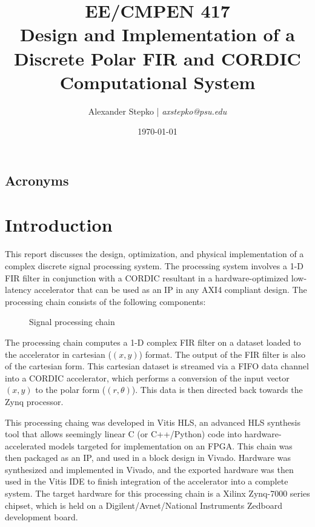 \documentclass[11pt]{report}
\title{\normalsize{EE/CMPEN 417}\Large\\\textbf{Design and Implementation of a Discrete Polar FIR and CORDIC Computational System}}
\author{Alexander Stepko | \emph{axstepko@psu.edu}}
\affil{The Pennsylvania State University\\School of Electrical Engineering and Computer Science\\\normalsize{Zheyu Li, PhD. Candidate}}
\date{\today}
\begin{document}
\begin{titlepage}
    \maketitle
\end{titlepage}
\begin{singlespace}
    \tableofcontents
\end{singlespace}
\newpage
\section*{Acronyms}
\begin{multicols}{2}
    \raggedright
    \printacronyms[heading=none]
\end{multicols}
\listoffigures
\listoftables
\newpage

\chapter{Introduction}
This report discusses the design, optimization, and physical implementation of a complex discrete signal processing system. The processing system involves a 1-D \ac{FIR} filter in conjunction with a \ac{CORDIC} resultant in a hardware-optimized low-latency accelerator that can be used as an IP in any AXI4 compliant design. The processing chain consists of the following components:
\begin{figure}[h!]
	\centering
	\fboxsep=3mm
	\caption{Signal processing chain}
	\label{processingChainGraph}
\end{figure}

The processing chain computes a 1-D complex FIR filter on a dataset loaded to the accelerator in cartesian ($(x, y)$) format. The output of the FIR filter is also of the cartesian form. This cartesian dataset is streamed via a FIFO data channel into a CORDIC accelerator, which performs a conversion of the input vector $(x, y)$ to the polar form ($(r, \theta)$). This data is then directed back towards the Zynq processor.

This processing chaing was developed in Vitis HLS, an advanced \ac{HLS} synthesis tool that allows seemingly linear C (or C++/Python) code into hardware-accelerated models targeted for implementation on an \ac{FPGA}. This chain was then packaged as an \ac{IP}, and used in a block design in Vivado. Hardware was synthesized and implemented in Vivado, and the exported hardware was then used in the Vitis IDE to finish integration of the accelerator into a complete system. The target hardware for this processing chain is a Xilinx Zynq-7000 series chipset, which is held on a Digilent/Avnet/National Instruments Zedboard development board.
\end{document}
